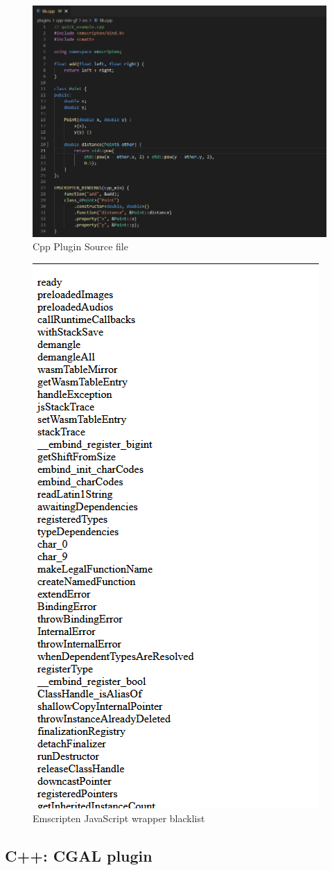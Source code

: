 \begin{figure}
  \graphicspath{{../../assets/images/6.1.3/}}
  \centering
  \includegraphics[width=0.50\linewidth]{source.PNG}
  \caption[loading a plugin]{Cpp Plugin Source file}
  \label{fig:min-cpp-source}
\end{figure}

\begin{figure}
  \graphicspath{{../../assets/images/6.1.3/}}
  \centering
  \includegraphics[width=0.50\linewidth]{whitelist.PNG}
  \caption[loading a plugin]{Emscripten JavaScript wrapper blacklist }
  \label{fig:min-cpp-whitelist}
\end{figure}

\subsection{C++: CGAL plugin}

